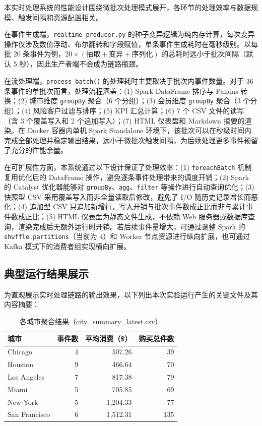 \documentclass[12pt,hyperref,a4paper,UTF8]{ctexart}
\begin{document}
本实时处理系统的性能设计围绕微批次处理模式展开，各环节的处理效率与数据规模、触发间隔和资源配置相关。

在事件生成端，\texttt{realtime\_producer.py} 的种子变异逻辑为纯内存计算，每次变异操作仅涉及数值浮动、布尔翻转和字段赋值，单条事件生成耗时在毫秒级别。以每批 20 条事件为例，$20 \times (抽取 + 变异 + 序列化)$ 的总耗时远小于批次间隔（默认 5 秒），因此生产者端不会成为链路瓶颈。

在流处理端，\texttt{process\_batch()} 的处理耗时主要取决于批次内事件数量。对于 36 条事件的单批次而言，处理流程涵盖：(1) Spark DataFrame 排序与 Pandas 转换；(2) 城市维度 \texttt{groupBy} 聚合（6 个分组）；(3) 会员维度 \texttt{groupBy} 聚合（3 个分组）；(4) 风险客户过滤与排序；(5) KPI 汇总计算；(6) 7 个 CSV 文件的读写（含 3 个覆盖写入和 2 个追加写入）；(7) HTML 仪表盘和 Markdown 摘要的渲染。在 Docker 容器内单机 Spark Standalone 环境下，该批次可以在秒级时间内完成全部处理并稳定输出结果，远小于微批次触发间隔，为后续处理更多事件预留了充分的性能余量。

在可扩展性方面，本系统通过以下设计保证了处理效率：(1) \texttt{foreachBatch} 机制复用优化后的 DataFrame 操作，避免逐条事件处理带来的调度开销；(2) Spark 的 Catalyst 优化器能够对 \texttt{groupBy}、\texttt{agg}、\texttt{filter} 等操作进行自动查询优化；(3) 快照型 CSV 采用覆盖写入而非全量读取后修改，避免了 I/O 随历史记录增长而恶化；(4) 追加型 CSV 只追加新增行，写入开销与批次事件数成正比而非与累计事件数成正比；(5) HTML 仪表盘为静态文件生成，不依赖 Web 服务器或数据库查询，渲染完成后无额外运行时开销。若后续事件量增大，可通过调整 Spark 的 \texttt{shuffle.partitions}（当前为 4）和 Worker 节点资源进行纵向扩展，也可通过 Kafka 模式下的消费者组实现横向扩展。

\subsection{典型运行结果展示}

为直观展示实时处理链路的输出效果，以下列出本次实验运行产生的关键文件及其内容摘要：

\begin{table}[H]
\centering
\caption{各城市聚合结果（city\_summary\_latest.csv）}
\begin{tabular}{lrrr}
\toprule
城市 & 事件数 & 平均消费（\$） & 购买总件数 \\
\midrule
Chicago & 4 & 507.26 & 39 \\
Houston & 9 & 466.64 & 70 \\
Los Angeles & 7 & 817.38 & 79 \\
Miami & 5 & 705.85 & 69 \\
New York & 5 & 1,204.33 & 77 \\
San Francisco & 6 & 1,512.31 & 135 \\
\bottomrule
\end{tabular}
\end{table}
\end{document}
